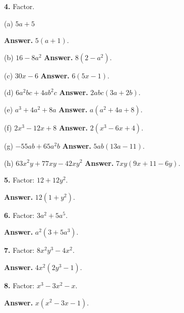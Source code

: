 \documentclass{ximera}
\begin{document}
\begin{problem}

\textbf{4.} Factor.

(a) $5a+5$ \qquad

\begin{hint}
\textbf{Answer.} $5(a+1)$.

(b) $16-8a^{2}$ \qquad \textbf{Answer.} $8\left(2-a^{2}\right)$.

(c) $30x-6$ \qquad \textbf{Answer.} $6(5x-1)$.

(d) $6a^{2}bc+4ab^{2}c$ \qquad \textbf{Answer.} $2abc(3a+2b)$.

(e) $a^{3}+4a^{2}+8a$ \qquad \textbf{Answer.} $a\left(a^{2}+4a+8\right)$.

(f) $2x^{3}-12x+8$ \qquad \textbf{Answer.} $2\left(x^{3}-6x+4\right)$.

(g) $-55ab+65a^{2}b$ \qquad \textbf{Answer.} $5ab(13a-11)$.

(h) $63x^{2}y+77xy-42xy^{2}$ \qquad \textbf{Answer.} $7xy(9x+11-6y)$.
\end{hint}
\end{problem}

\begin{problem}

\textbf{5.} Factor: $12+12y^{2}$. \qquad

\begin{hint}
\textbf{Answer.}
$12\left(1+y^{2}\right)$.
\end{hint}
\end{problem}

\begin{problem}

\textbf{6.} Factor: $3a^{2}+5a^{5}$. \qquad

\begin{hint}
\textbf{Answer.}
$a^{2}\left(3+5a^{3}\right)$.
\end{hint}
\end{problem}

\begin{problem}

\textbf{7.} Factor: $8x^{2}y^{3}-4x^{2}$. \qquad

\begin{hint}
\textbf{Answer.}
$4x^{2}\left(2y^{3}-1\right)$.
\end{hint}
\end{problem}

\begin{problem}

\textbf{8.} Factor: $x^{3}-3x^{2}-x$. \qquad

\begin{hint}
\textbf{Answer.}
$x\left(x^{2}-3x-1\right)$.
\end{hint}
\end{problem}
\end{document}
